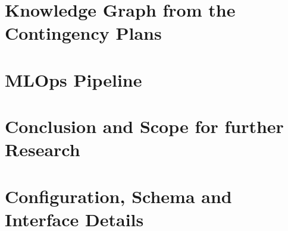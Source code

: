 \documentclass[a4paper, 12pt]{report}
\renewcommand{\_}{\textunderscore\allowbreak}
\theoremstyle{definition}
\begin{document}
\chapter{Knowledge Graph from the Contingency Plans}

\chapter{MLOps Pipeline}

\chapter{Conclusion and Scope for further Research}

\appendix
\chapter{Configuration, Schema and Interface Details}


\newpage
\renewcommand{\bibname}{References}



\end{document}
